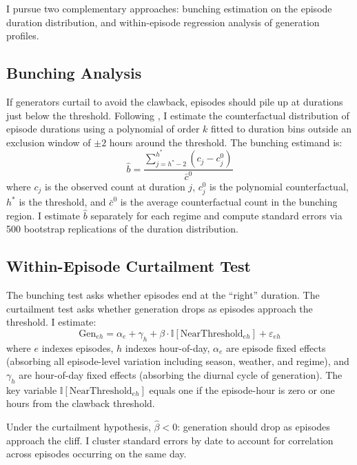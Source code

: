 \documentclass[12pt]{article}
\newcommand{\ind}{\mathbb{I}}
\begin{document}
I pursue two complementary approaches: bunching estimation on the episode duration distribution, and within-episode regression analysis of generation profiles.

\subsection{Bunching Analysis}

If generators curtail to avoid the clawback, episodes should pile up at durations just below the threshold. Following \citet{Kleven2016}, I estimate the counterfactual distribution of episode durations using a polynomial of order $k$ fitted to duration bins outside an exclusion window of $\pm 2$ hours around the threshold. The bunching estimand is:
\begin{equation}
\hat{b} = \frac{\sum_{j = h^* - 2}^{h^*} (c_j - c_j^0)}{\bar{c}^0}
\end{equation}
where $c_j$ is the observed count at duration $j$, $c_j^0$ is the polynomial counterfactual, $h^*$ is the threshold, and $\bar{c}^0$ is the average counterfactual count in the bunching region. I estimate $\hat{b}$ separately for each regime and compute standard errors via 500 bootstrap replications of the duration distribution.

\subsection{Within-Episode Curtailment Test}

The bunching test asks whether episodes end at the ``right'' duration. The curtailment test asks whether generation drops as episodes approach the threshold. I estimate:
\begin{equation}
\text{Gen}_{eh} = \alpha_e + \gamma_h + \beta \cdot \ind[\text{NearThreshold}_{eh}] + \varepsilon_{eh}
\label{eq:curtailment}
\end{equation}
where $e$ indexes episodes, $h$ indexes hour-of-day, $\alpha_e$ are episode fixed effects (absorbing all episode-level variation including season, weather, and regime), and $\gamma_h$ are hour-of-day fixed effects (absorbing the diurnal cycle of generation). The key variable $\ind[\text{NearThreshold}_{eh}]$ equals one if the episode-hour is zero or one hours from the clawback threshold.

Under the curtailment hypothesis, $\hat{\beta} < 0$: generation should drop as episodes approach the cliff. I cluster standard errors by date to account for correlation across episodes occurring on the same day.
\end{document}
